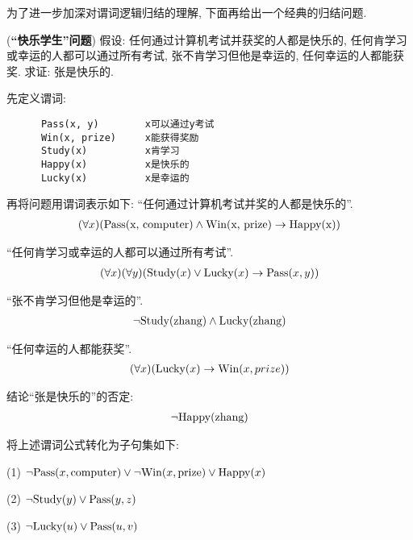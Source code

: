为了进一步加深对谓词逻辑归结的理解, 下面再给出一个经典的归结问题.
\begin{example}
(\textbf{“快乐学生”问题}) 假设: 任何通过计算机考试并获奖的人都是快乐的, 任何肯学习或幸运的人都可以通过所有考试, 张不肯学习但他是幸运的, 任何幸运的人都能获奖.
求证: 张是快乐的.
\end{example}
\begin{result}
先定义谓词:
\begin{Verbatim}
      Pass(x, y)        x可以通过y考试
      Win(x, prize)     x能获得奖励
      Study(x)          x肯学习
      Happy(x)          x是快乐的
      Lucky(x)          x是幸运的
\end{Verbatim}

再将问题用谓词表示如下: “任何通过计算机考试并奖的人都是快乐的”.
\begin{align}
  (\forall x)(\textup{Pass(x, computer)}\wedge \textup{Win(x, prize)}\rightarrow \textup{Happy(x)})
\end{align}

“任何肯学习或幸运的人都可以通过所有考试”.
\begin{align}
  (\forall x) (\forall  y) (\textup{Study}(x)\vee \textup{Lucky}(x)\rightarrow \textup{Pass}(x, y))
\end{align}

“张不肯学习但他是幸运的”.
\begin{align}
  \neg \textup{Study}(\textup{zhang})\wedge \textup{Lucky}(\textup{zhang})
\end{align}

“任何幸运的人都能获奖”.
\begin{align}
  (\forall x) (\textup{Lucky}(x)\rightarrow \textup{Win}(x, prize))
\end{align}

结论“张是快乐的”的否定:
\begin{align}
  \neg \textup{Happy}(\textup{zhang})
\end{align}
\end{result}

将上述谓词公式转化为子句集如下:

    (1) $\neg \textup{Pass}(x, \textup{computer})\vee \neg \textup{Win}(x, \textup{prize})\vee \textup{Happy}(x)$

    (2) $\neg \textup{Study}(y)\vee \textup{Pass}(y, z)$

    (3) $\neg \textup{Lucky}(u)\vee \textup{Pass}(u, v)$

